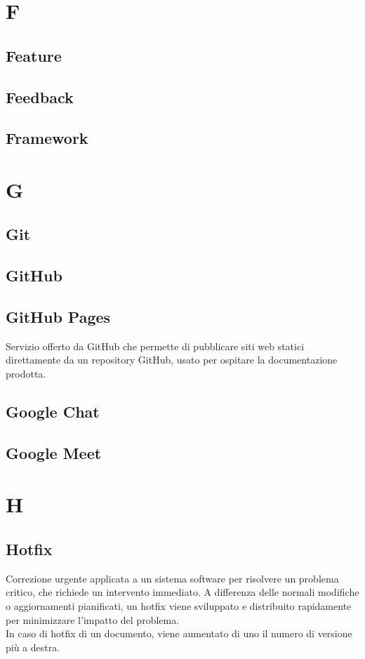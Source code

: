 \section{F}
    \subsection{Feature}
    \subsection{Feedback}
    \subsection{Framework}
\section{G}
    \subsection{Git}
    \subsection{GitHub}
    \subsection{GitHub Pages}
    Servizio offerto da GitHub che permette di pubblicare siti web statici direttamente da un repository GitHub,
    usato per ospitare la documentazione prodotta.
    \subsection{Google Chat}
    \subsection{Google Meet}    
\section{H}
    \subsection{Hotfix}
    Correzione urgente applicata a un sistema software per risolvere un problema critico, 
    che richiede un intervento immediato. A differenza delle normali modifiche o aggiornamenti pianificati, 
    un hotfix viene sviluppato e distribuito rapidamente per minimizzare l'impatto del problema.\\
    In caso di hotfix di un documento, viene aumentato di uno il numero di versione più a destra.

